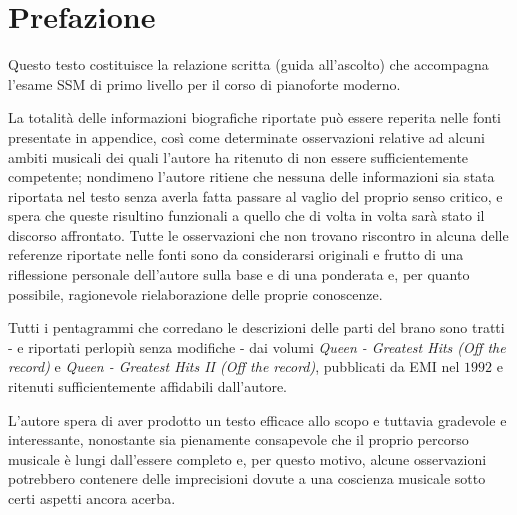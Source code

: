\documentclass[12pt]{article}
\begin{document}

\tableofcontents
\newpage

\section*{Prefazione}
Questo testo costituisce la relazione scritta (guida all'ascolto) che accompagna l'esame SSM di primo livello per il corso di pianoforte moderno.

La totalità delle informazioni biografiche riportate può essere reperita nelle fonti presentate in appendice, così come determinate osservazioni relative ad alcuni ambiti musicali dei quali l'autore ha ritenuto di non essere sufficientemente competente; nondimeno l'autore ritiene che nessuna delle informazioni sia stata riportata nel testo senza averla fatta passare al vaglio del proprio senso critico, e spera che queste risultino funzionali a quello che di volta in volta sarà stato il discorso affrontato. Tutte le osservazioni che non trovano riscontro in alcuna delle referenze riportate nelle fonti sono da considerarsi originali e frutto di una riflessione personale dell'autore sulla base e di una ponderata e, per quanto possibile, ragionevole rielaborazione delle proprie conoscenze.

Tutti i pentagrammi che corredano le descrizioni delle parti del brano sono tratti - e riportati perlopiù senza modifiche - dai volumi \emph{Queen - Greatest Hits (Off the record)} e \emph{Queen - Greatest Hits II (Off the record)}, pubblicati da EMI nel \(1992\) e ritenuti sufficientemente affidabili dall'autore.

L'autore spera di aver prodotto un testo efficace allo scopo e tuttavia gradevole e interessante, nonostante sia pienamente consapevole che il proprio percorso musicale è lungi dall'essere completo e, per questo motivo, alcune osservazioni potrebbero contenere delle imprecisioni dovute a una coscienza musicale sotto certi aspetti ancora acerba.
\end{document}
